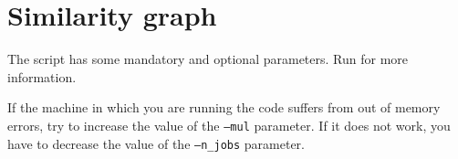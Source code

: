 \inputminted{Python}{../code/data_preparation.py}

\pagebreak
\section{Similarity graph} \label{simgra}
The script has some mandatory and optional parameters.
Run  for more information.

If the machine in which you are running the code suffers from out of memory errors,
try to increase the value of the \texttt{--mul} parameter.
If it does not work, you have to decrease the value of the \texttt{--n\_jobs} parameter.

\inputminted{Python}{../code/similarity_graph.py}